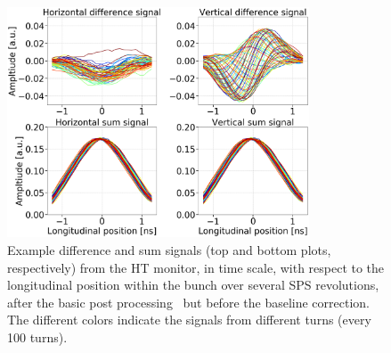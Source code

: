 \begin{figure}[!h]
   \centering         
   \includegraphics[width=0.8\textwidth]{images/Ch4/HT_1D__20180530_135105exampleAcq_4thesis_turnsStart0_Stop6000_step100_new.png}
       \caption{Example difference and sum signals (top and bottom plots, respectively) from the HT monitor, in time scale, with respect to the longitudinal position within the bunch over several SPS revolutions, after the basic post processing~\cite{Levens:2313358} but before the baseline correction. The different colors indicate the signals from different turns (every 100 turns). } %
       \label{fig:HT_example_signals}
\end{figure}


